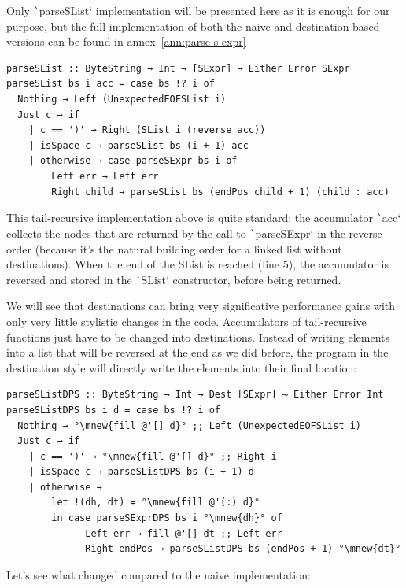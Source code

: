 \documentclass[english]{jflart}
\newcommand{\mnew}[1]{\colorbox{green}{#1}}
\begin{document}
Only \texttt`parseSList` implementation will be presented here as it is enough for our purpose, but the full implementation of both the naive and destination-based versions can be found in annex~\ref{ann:parse-s-expr}

{\small
\begin{verbatim}
parseSList :: ByteString → Int → [SExpr] → Either Error SExpr
parseSList bs i acc = case bs !? i of
  Nothing → Left (UnexpectedEOFSList i)
  Just c → if
    | c == ')' → Right (SList i (reverse acc))
    | isSpace c → parseSList bs (i + 1) acc
    | otherwise → case parseSExpr bs i of
        Left err → Left err
        Right child → parseSList bs (endPos child + 1) (child : acc)
\end{verbatim}
}

This tail-recursive implementation above is quite standard: the accumulator \texttt`acc` collects the nodes that are returned by the call to \texttt`parseSExpr` in the reverse order (because it's the natural building order for a linked list without destinations). When the end of the SList is reached (line 5), the accumulator is reversed and stored in the \texttt`SList` constructor, before being returned.

We will see that destinations can bring very significative performance gains with only very little stylistic changes in the code. Accumulators of tail-recursive functions just have to be changed into destinations. Instead of writing elements into a list that will be reversed at the end as we did before, the program in the destination style will directly write the elements into their final location:

{\small
\begin{verbatim}
parseSListDPS :: ByteString → Int → Dest [SExpr] ⊸ Either Error Int
parseSListDPS bs i d = case bs !? i of
  Nothing → °\mnew{fill @'[] d}° ;; Left (UnexpectedEOFSList i)
  Just c → if
    | c == ')' → °\mnew{fill @'[] d}° ;; Right i
    | isSpace c → parseSListDPS bs (i + 1) d
    | otherwise →
        let !(dh, dt) = °\mnew{fill @'(:) d}°
        in case parseSExprDPS bs i °\mnew{dh}° of
              Left err → fill @'[] dt ;; Left err
              Right endPos → parseSListDPS bs (endPos + 1) °\mnew{dt}°
\end{verbatim}
}

Let's see what changed compared to the naive implementation:
\end{document}
